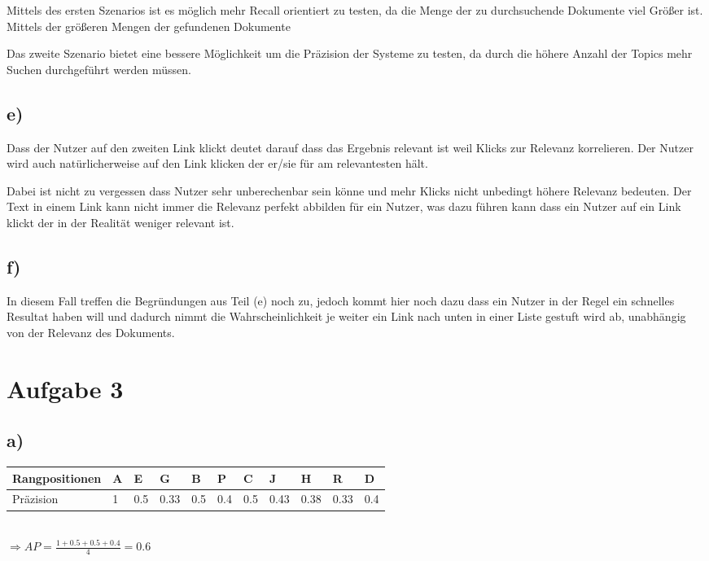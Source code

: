 \documentclass[11pt,a4paper,parskip=half ]{scrartcl}
\begin{document}
	Mittels des ersten Szenarios ist es möglich mehr Recall orientiert zu testen, da die Menge der zu durchsuchende Dokumente viel Größer ist. Mittels der größeren Mengen der gefundenen Dokumente 
	
	Das zweite Szenario bietet eine bessere Möglichkeit um die Präzision der Systeme zu testen, da durch die höhere Anzahl der Topics mehr Suchen durchgeführt werden müssen.
	
	\subsection*{e)} Dass der Nutzer auf den zweiten Link klickt deutet darauf dass das Ergebnis relevant ist weil Klicks zur Relevanz korrelieren. Der Nutzer wird auch natürlicherweise auf den Link klicken der er/sie für am relevantesten hält.
	
	Dabei ist nicht zu vergessen dass Nutzer sehr unberechenbar sein könne und mehr Klicks nicht unbedingt höhere Relevanz bedeuten. Der Text in einem Link kann nicht immer die Relevanz perfekt abbilden für ein Nutzer, was dazu führen kann dass ein Nutzer auf ein Link klickt der in der Realität weniger relevant ist.
	
	\subsection*{f)} In diesem Fall treffen die Begründungen aus Teil (e) noch zu, jedoch kommt hier noch dazu dass ein Nutzer in der Regel ein schnelles Resultat haben will und dadurch nimmt die Wahrscheinlichkeit je weiter ein Link nach unten in einer Liste gestuft wird ab, unabhängig von der Relevanz des Dokuments.
	
	\section*{Aufgabe 3}
	
	\subsection*{a)}
	
	\begin{table}[h]
		\begin{tabular}{|l|l|l|l|l|l|l|l|l|l|l|}
			\hline
			Rangpositionen     & A & E   & G    & B   & P   & C   & J    & H    & R    & D   \\ \hline
			Präzision               & 1 & 0.5 & 0.33 & 0.5 & 0.4 & 0.5 & 0.43 & 0.38 & 0.33 & 0.4 \\ \hline
		\end{tabular}\\[0.5cm]
		
		$\Rightarrow AP = \frac{1+0.5+0.5+0.4}{4} = 0.6$
	\end{table}
	
\end{document}
